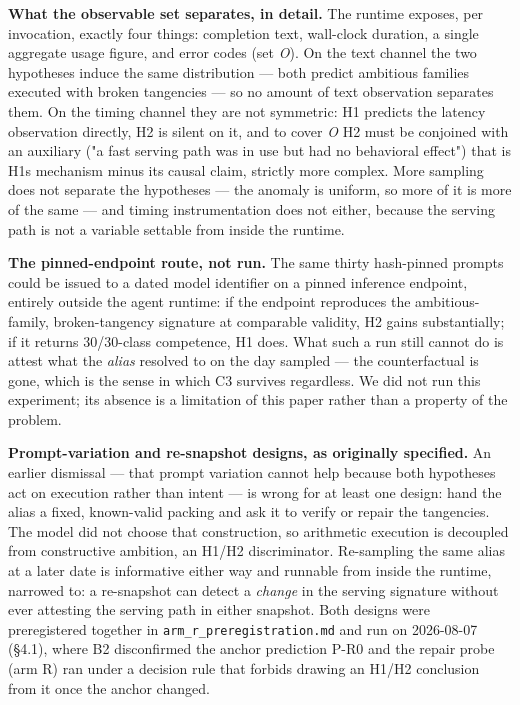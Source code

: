\textbf{What the observable set separates, in detail.} The runtime exposes, per invocation, exactly four things: completion text, wall-clock duration, a single aggregate usage figure, and error codes (set \emph{O}). On the text channel the two hypotheses induce the same distribution --- both predict ambitious families executed with broken tangencies --- so no amount of text observation separates them. On the timing channel they are not symmetric: H1 predicts the latency observation directly, H2 is silent on it, and to cover \emph{O} H2 must be conjoined with an auxiliary ("a fast serving path was in use but had no behavioral effect") that is H1\textquotesingle s mechanism minus its causal claim, strictly more complex. More sampling does not separate the hypotheses --- the anomaly is uniform, so more of it is more of the same --- and timing instrumentation does not either, because the serving path is not a variable settable from inside the runtime.

\textbf{The pinned-endpoint route, not run.} The same thirty hash-pinned prompts could be issued to a dated model identifier on a pinned inference endpoint, entirely outside the agent runtime: if the endpoint reproduces the ambitious-family, broken-tangency signature at comparable validity, H2 gains substantially; if it returns 30/30-class competence, H1 does. What such a run still cannot do is attest what the \emph{alias} resolved to on the day sampled --- the counterfactual is gone, which is the sense in which C3 survives regardless. We did not run this experiment; its absence is a limitation of this paper rather than a property of the problem.

\textbf{Prompt-variation and re-snapshot designs, as originally specified.} An earlier dismissal --- that prompt variation cannot help because both hypotheses act on execution rather than intent --- is wrong for at least one design: hand the alias a fixed, known-valid packing and ask it to verify or repair the tangencies. The model did not choose that construction, so arithmetic execution is decoupled from constructive ambition, an H1/H2 discriminator. Re-sampling the same alias at a later date is informative either way and runnable from inside the runtime, narrowed to: a re-snapshot can detect a \emph{change} in the serving signature without ever attesting the serving path in either snapshot. Both designs were preregistered together in \texttt{arm\_r\_preregistration.md} and run on 2026-08-07 (§4.1), where B2 disconfirmed the anchor prediction P-R0 and the repair probe (arm R) ran under a decision rule that forbids drawing an H1/H2 conclusion from it once the anchor changed.

